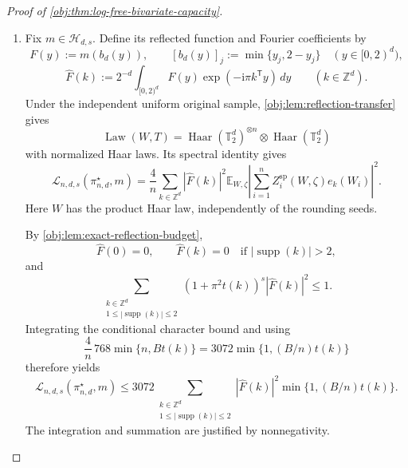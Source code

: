 \begin{proof}[Proof of \cref{obj:thm:log-free-bivariate-capacity}]
\begin{enumerate}
Every support-one or support-two frequency is a listed representative or its negative: its first nonzero coordinate determines the orientation, and there are finitely many representatives below each fixed complexity. Since real signs give
\[
\sum_i Z_i^{\mathrm{sp}}(w,\zeta)e_{-k}(w_i)
=
\overline{\sum_i Z_i^{\mathrm{sp}}(w,\zeta)e_k(w_i)},
\qquad
t(-k)=t(k),
\]
we obtain, for every supported frequency and every deterministic \(w\),
\[
\mathbb E_\zeta
\left|
\sum_{i=1}^n Z_i^{\mathrm{sp}}(w,\zeta)e_k(w_i)
\right|^2
\leq768\min\{n,Bt(k)\},
\qquad
1\leq|\operatorname{supp}(k)|\leq2.
\]

\item
Fix \(m\in\mathcal H_{d,s}\). Define its reflected function and Fourier coefficients by
\[
F(y):=m(b_d(y)),
\qquad
[b_d(y)]_j:=\min\{y_j,2-y_j\}
\quad(y\in[0,2)^d),
\]
\[
\widehat F(k)
:=
2^{-d}\int_{[0,2)^d}
F(y)\exp(-\mathrm i\pi k^{\mathsf T}y)\,dy
\qquad(k\in\mathbb Z^d).
\]
Under the independent uniform original sample, \cref{obj:lem:reflection-transfer} gives
\[
\operatorname{Law}(W,T)
=
\operatorname{Haar}(\mathbb T_2^d)^{\otimes n}
\otimes\operatorname{Haar}(\mathbb T_2^d)
\]
with normalized Haar laws. Its spectral identity gives
\[
\mathcal L_{n,d,s}(\pi^\star_{n,d},m)
=
\frac4n
\sum_{k\in\mathbb Z^d}
|\widehat F(k)|^2
\mathbb E_{W,\zeta}
\left|
\sum_{i=1}^n Z_i^{\mathrm{sp}}(W,\zeta)e_k(W_i)
\right|^2.
\]
Here \(W\) has the product Haar law, independently of the rounding seeds.

By \cref{obj:lem:exact-reflection-budget},
\[
\widehat F(0)=0,
\qquad
\widehat F(k)=0
\quad\text{if }|\operatorname{supp}(k)|>2,
\]
and
\[
\sum_{\substack{k\in\mathbb Z^d\\
1\leq|\operatorname{supp}(k)|\leq2}}
(1+\pi^2t(k))^s|\widehat F(k)|^2
\leq1.
\]
Integrating the conditional character bound and using
\[
\frac4n\,768\min\{n,Bt(k)\}
=
3072\min\{1,(B/n)t(k)\}
\]
therefore yields
\[
\mathcal L_{n,d,s}(\pi^\star_{n,d},m)
\leq
3072
\sum_{\substack{k\in\mathbb Z^d\\
1\leq|\operatorname{supp}(k)|\leq2}}
|\widehat F(k)|^2\min\{1,(B/n)t(k)\}.
\]
The integration and summation are justified by nonnegativity.


\end{enumerate}
\end{proof}
